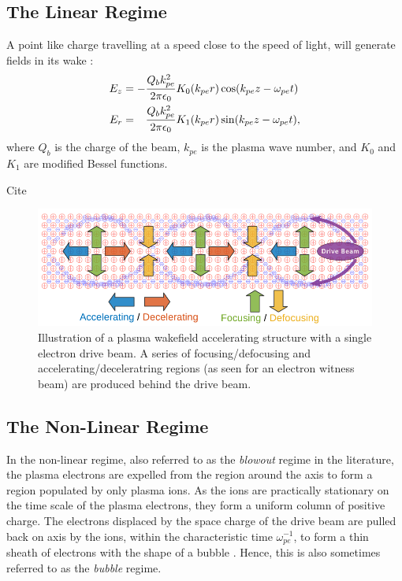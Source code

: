 \subsection{The Linear Regime}
\label{Int:PWFA:Lin}

A point like charge travelling at a speed close to the speed of light, will generate fields in its wake \cite{van_der_meer:1985, chen:1985}:
\begin{align}
    E_{z} &= -\frac{Q_{b}k_{pe}^{2}}{2\pi\epsilon_{0}} K_{0}(k_{pe}r)\cos(k_{pe}z - \omega_{pe}t) \label{EQ:PWFA:EZ} \\
    E_{r} &= \hphantom{-} \frac{Q_{b}k_{pe}^{2}}{2\pi\epsilon_{0}} K_{1}(k_{pe}r)\sin(k_{pe}z - \omega_{pe}t), \label{EQ:PWFA:ER}
\end{align}
where $Q_{b}$ is the charge of the beam, $k_{pe}$ is the plasma wave number, and $K_{0}$ and $K_{1}$ are modified Bessel functions. 

Cite \cite{ruth:1985}


\begin{figure}[hbt]
    \centering
    \includegraphics[width=0.85\linewidth,trim={0mm 0mm 0mm 0mm},clip]{figures/PlasmaWakefield}
    \caption{\label{Fig:PWFA:Illust} Illustration of a plasma wakefield accelerating structure with a single electron drive beam. A series of focusing/defocusing and accelerating/deceleratring regions (as seen for an electron witness beam) are produced behind the drive beam.}
\end{figure}

\subsection{The Non-Linear Regime}
\label{Int:PWFA:NLin}

In the non-linear regime, also referred to as the \textit{blowout} regime in the literature, the plasma electrons are expelled from the region around the axis to form a region populated by only plasma ions. As the ions are practically stationary on the time scale of the plasma electrons, they form a uniform column of positive charge. The electrons displaced by the space charge of the drive beam are pulled back on axis by the ions, within the characteristic time $\omega_{pe}^{-1}$, to form a thin sheath of electrons with the shape of a bubble \cite{lu:2006a,lu:2006}. Hence, this is also sometimes referred to as the \textit{bubble} regime.

